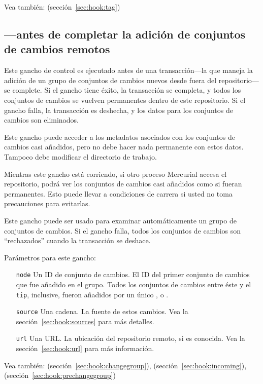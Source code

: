 Vea también:  (sección~\ref{sec:hook:tag})

\subsection{---antes de completar la adición
de conjuntos de cambios remotos}
\label{sec:hook:pretxnchangegroup}

Este gancho de control es ejecutado antes de una transacción---la que
maneja la adición de un grupo de conjuntos de cambios nuevos desde
fuera del repositorio---se complete.  Si el gancho tiene éxito, la
transacción se completa, y todos los conjuntos de cambios se vuelven
permanentes dentro de este repositorio. Si el gancho falla, la
transacción es deshecha, y los datos para los conjuntos de cambios son
eliminados.

Este gancho puede acceder a los metadatos asociados con los conjuntos
de cambios casi añadidos, pero no debe hacer nada permanente con estos
datos. Tampoco debe modificar el directorio de trabajo.

Mientras este gancho está corriendo, si otro proceso Mercurial accesa
el repositorio, podrá ver los conjuntos de cambios casi añadidos como
si fueran permanentes. Esto puede llevar a condiciones de carrera si
usted no toma precauciones para evitarlas.

Este gancho puede ser usado para examinar automáticamente un grupo de
conjuntos de cambios. Si el gancho falla, todos los conjuntos de
cambios son ``rechazados'' cuando la transacción se deshace.

Parámetros para este gancho:
\begin{itemize}
  \item[\texttt{node}] Un ID de conjunto de cambios. El ID del primer
  conjunto de cambios que fue añadido en el grupo. Todos los
  conjuntos de cambios entre éste y el
  \texttt{tip}, inclusive, fueron añadidos
  por un único ,  o .
\item[\texttt{source}] Una cadena. La fuente de estos cambios. Vea la
  sección~\ref{sec:hook:sources} para más detalles.
\item[\texttt{url}] Una URL. La ubicación del repositorio remoto, si
  es conocida. Vea la sección~\ref{sec:hook:url} para más información.
\end{itemize}

Vea también:  (sección~\ref{sec:hook:changegroup}),
 (sección~\ref{sec:hook:incoming}),
 (sección~\ref{sec:hook:prechangegroup})

